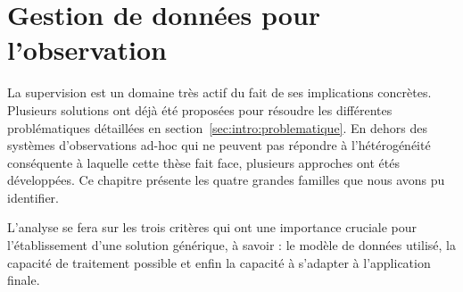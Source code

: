 \chapter{Gestion de données pour l'observation}
\minitoc

La supervision est un domaine très actif du fait de ses implications concrètes. Plusieurs solutions ont déjà été proposées pour résoudre les différentes problématiques détaillées en section~\ref{sec:intro:problematique}. En dehors des systèmes d'observations ad-hoc qui ne peuvent pas répondre à l'hétérogénéité conséquente à laquelle cette thèse fait face, plusieurs approches ont étés développées. Ce chapitre présente les quatre grandes familles que nous avons pu identifier.

L'analyse se fera sur les trois critères qui ont une importance cruciale pour l'établissement d'une solution générique, à savoir : le modèle de données utilisé, la capacité de traitement possible et enfin la capacité à s'adapter à l'application finale.



